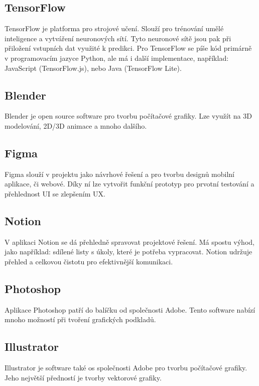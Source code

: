 \subsection{TensorFlow}
TensorFlow je platforma pro strojové učení. Slouží pro trénování umělé inteligence a vytváření neuronových sítí. Tyto neuronové sítě jsou pak při přiložení vstupních dat využité k predikci. Pro TensorFlow se píše kód primárně v programovacím jazyce Python, ale má i další implementace, například: JavaScript (TensorFlow.js), nebo Java (TensorFlow Lite).

\subsection{Blender}
Blender je open source software pro tvorbu počítačové grafiky. Lze využít na 3D modelování, 2D/3D animace a mnoho dalšího.

\subsection{Figma}
Figma slouží v projektu jako návrhové řešení a pro tvorbu designů mobilní aplikace, či webové. Díky ní lze vytvořit funkční prototyp pro prvotní testování a přehlednost UI se zlepšením UX.

\subsection{Notion}
V aplikaci Notion se dá přehledně spravovat projektové řešení. Má spostu výhod, jako například: sdílené listy s úkoly, které je potřeba vypracovat. Notion udržuje přehled a celkovou čistotu pro efektivnější komunikaci.

\subsection{Photoshop}
Aplikace Photoshop patří do balíčku od společnosti Adobe. Tento software nabízí mnoho možností při tvoření grafických podkladů.

\subsection{Illustrator}
Illustrator je software také os společnosti Adobe pro tvorbu počítačové grafiky. Jeho největší předností je tvorby vektorové grafiky.
